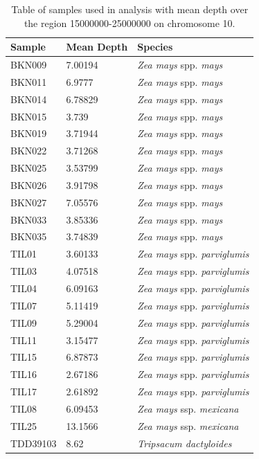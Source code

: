 \begin{table}
\begin{center}
	\caption{Table of samples used in analysis with mean depth over the region 15000000-25000000 on chromosome 10.}
	\begin{tabular} { | p{5cm} | p{5cm} | p{5cm} | }
	\hline
	\textbf{Sample} & \textbf{Mean Depth} & \textbf{Species} \\ \hline
	BKN009 & 7.00194 & {\it Zea mays} spp. {\it mays}\\ \hline
	BKN011 & 6.9777  & {\it Zea mays} spp. {\it mays}\\ \hline
	BKN014 & 6.78829 & {\it Zea mays} spp. {\it mays} \\ \hline
	BKN015 & 3.739 & {\it Zea mays} spp. {\it mays} \\ \hline
	BKN019 & 3.71944 & {\it Zea mays} spp. {\it mays} \\ \hline
	BKN022 & 3.71268 & {\it Zea mays} spp. {\it mays} \\ \hline
	BKN025 & 3.53799 & {\it Zea mays} spp. {\it mays} \\ \hline
	BKN026 & 3.91798 & {\it Zea mays} spp. {\it mays} \\ \hline
	BKN027 & 7.05576 & {\it Zea mays} spp. {\it mays} \\ \hline
	BKN033 & 3.85336 & {\it Zea mays} spp. {\it mays} \\ \hline
	BKN035 & 3.74839 & {\it Zea mays} spp. {\it mays} \\ \hline
	TIL01 & 3.60133 & {\it Zea mays} spp. {\it parviglumis}\\ \hline
	TIL03 & 4.07518 & {\it Zea mays} spp. {\it parviglumis} \\ \hline
	TIL04 & 6.09163 & {\it Zea mays} spp. {\it parviglumis} \\ \hline
	TIL07 & 5.11419 & {\it Zea mays} spp. {\it parviglumis} \\ \hline
	TIL09 & 5.29004 & {\it Zea mays} spp. {\it parviglumis} \\ \hline
	TIL11 & 3.15477 & {\it Zea mays} spp. {\it parviglumis} \\ \hline
	TIL15 & 6.87873 & {\it Zea mays} spp. {\it parviglumis} \\ \hline
	TIL16 & 2.67186 & {\it Zea mays} spp. {\it parviglumis} \\ \hline
	TIL17 & 2.61892 & {\it Zea mays} spp. {\it parviglumis} \\ \hline
	TIL08 & 6.09453 & \textit{Zea mays} ssp. {\it mexicana} \\ \hline
	TIL25 & 13.1566 & \textit{Zea mays} ssp. {\it mexicana} \\ \hline
	TDD39103 & 8.62 & \textit{Tripsacum dactyloides} \\ \hline
	\end{tabular}
	\label{tab:samples}
	\end{center}
\end{table}
